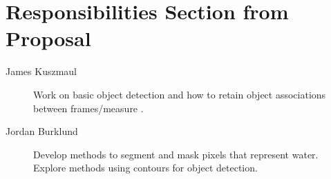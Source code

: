 \documentclass{article}
\begin{document}
\section{Responsibilities Section from Proposal}
\begin{description}
\item[James Kuszmaul] Work on basic object detection and how
  to retain object associations between frames/measure .

\item[Jordan Burklund] Develop methods to segment and mask pixels that represent water. Explore methods using contours for object detection.
\end{description}
\end{document}

